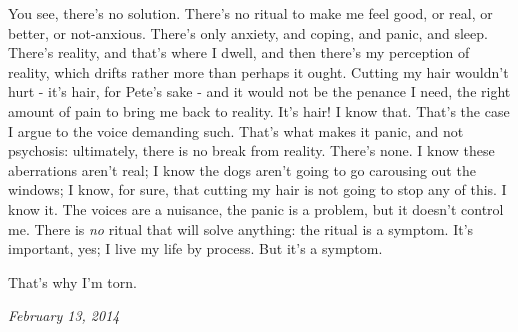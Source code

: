 \begin{leftcolumn}
You see, there's no solution. There's no ritual to make me feel good, or real, or better, or not-anxious. There's only anxiety, and coping, and panic, and sleep. There's reality, and that's where I dwell, and then there's my perception of reality, which drifts rather more than perhaps it ought. Cutting my hair wouldn't hurt - it's hair, for Pete's sake - and it would not be the penance I need, the right amount of pain to bring me back to reality. It's hair! I know that. That's the case I argue to the voice demanding such. That's what makes it panic, and not psychosis: ultimately, there is no break from reality. There's none. I know these aberrations aren't real; I know the dogs aren't going to go carousing out the windows; I know, for sure, that cutting my hair is not going to stop any of this. I know it. The voices are a nuisance, the panic is a problem, but it doesn't control me. There is \emph{no} ritual that will solve anything: the ritual is a symptom. It's important, yes; I live my life by process. But it's a symptom.

That's why I'm torn.
\newpage

\end{leftcolumn}
\begin{rightcolumn*}
  \begin{flushright}
\emph{February 13, 2014}
\end{flushright}
\end{rightcolumn*}
